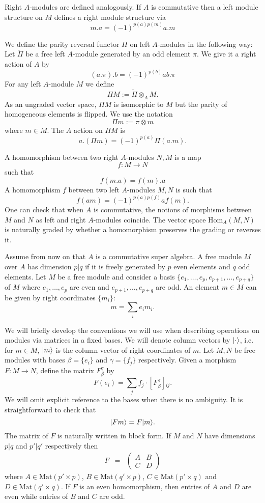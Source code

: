 \documentclass[11pt]{amsart}
\numberwithin{equation}{section}
\numberwithin{figure}{section}
\theoremstyle{plain}
\theoremstyle{definition}
\theoremstyle{remark}
\begin{document}
Right $A$-modules are defined analogously. If $A$ is commutative
then a left module structure on $M$ defines a right module structure
via 
\[
m.a=(-1)^{p(a)p(m)}a.m
\]


We define the parity reversal functor $\Pi$ on left $A$-modules
in the following way: Let $\tilde{\Pi}$ be a free left $A$-module
generated by an odd element $\pi$. We give it a right action of $A$
by 
\[
(a.\pi).b=(-1)^{p(b)}ab.\pi
\]
For any left $A$-module $M$ we define 
\[
\Pi M:=\tilde{\Pi}\otimes_{A}M.
\]
As an ungraded vector space, $\Pi M$ is isomorphic to $M$ but the
parity of homogeneous elements is flipped. We use the notation 
\[
\Pi m:=\pi\otimes m
\]
where $m\in M$. The $A$ action on $\Pi M$ is 
\[
a.(\Pi m)=(-1)^{p(a)}\Pi(a.m).
\]


A homomorphism between two right $A$-modules $N,M$ is a map 
\[
f:M\rightarrow N
\]
such that 
\[
f(m.a)=f(m).a
\]
A homomorphism $f$ between two left $A$-modules $M,N$ is such that
\[
f(am)=(-1)^{p(a)p(f)}af(m).
\]
One can check that when $A$ is commutative, the notions of morphisms
between $M$ and $N$ as left and right $A$-modules coincide. The
vector space $\mbox{Hom}_{A}(M,N)$ is naturally graded by whether
a homomorphism preserves the grading or reverses it. 

Assume from now on that $A$ is a commutative super algebra. A free
module $M$ over $A$ has dimension $p|q$ if it is freely generated
by $p$ even elements and $q$ odd elements. Let $M$ be a free module
and consider a basis $\{e_{1},\dots,e_{p},e_{p+1},\dots,e_{p+q}\}$
of $M$ where $e_{1},\dots,e_{p}$ are even and $e_{p+1},\dots,e_{p+q}$
are odd. An element $m\in M$ can be given by right coordinates $\{m_{i}\}$:
\[
m=\sum_{i}e_{i}m_{i}.
\]


We will briefly develop the conventions we will use when describing
operations on modules via matrices in a fixed bases. We will denote
column vectors by $|\cdot\rangle$, i.e. for $m\in M$, $|m\rangle$ is
the column vector of right coordinates of $m$. Let $M,N$ be free
modules with bases $\beta=\{e_{i}\}$ and $\gamma=\{f_{j}\}$ respectively.
Given a morphism $F:M\rightarrow N$, define the matrix $F_{\beta}^{\gamma}$
by 
\[
F(e_{i})=\sum_{j}f_{j}\cdot[F_{\beta}^{\gamma}]{}_{ij}.
\]
We will omit explicit reference to the bases when there is no ambiguity.
It is straightforward to check that 
\[
|Fm\rangle=F|m\rangle.
\]
The matrix of $F$ is naturally written in block form. If $M$ and
$N$ have dimensions $p|q$ and $p'|q'$ respectively then 
\begin{eqnarray}
F & = & \left(\begin{matrix}A & B\\
C & D
\end{matrix}\right)\label{eq:BlockMatrix}
\end{eqnarray}
where $A\in\mbox{Mat}(p'\times p)$, $B\in\mbox{Mat}(q'\times p)$,
$C\in\mbox{Mat}(p'\times q)$ and $D\in\mbox{Mat}(q'\times q)$. If
$F$ is an even homomorphism, then entries of $A$ and $D$ are even
while entries of $B$ and $C$ are odd. 
\end{document}
